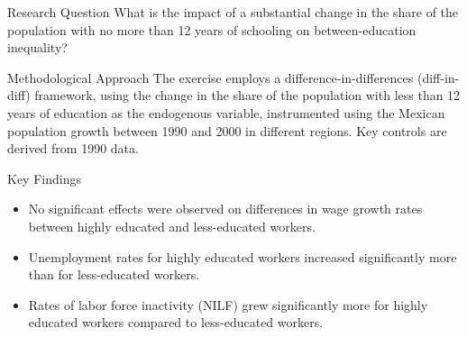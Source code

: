 \begin{frame}

    \begin{block}{Research Question}
        What is the impact of a substantial change in the share of the population with no more than 12 years of schooling on between-education inequality?
    \end{block}
    
    \begin{block}{Methodological Approach}
        The exercise employs a difference-in-differences (diff-in-diff) framework, using the change in the share of the population with less than 12 years of education as the endogenous variable, instrumented using the Mexican population growth between 1990 and 2000 in different regions. Key controls are derived from 1990 data.
    \end{block}
    
    \begin{block}{Key Findings}
        \begin{itemize}
            \item No significant effects were observed on differences in wage growth rates between highly educated and less-educated workers.
            \item Unemployment rates for highly educated workers increased significantly more than for less-educated workers.
            \item Rates of labor force inactivity (NILF) grew significantly more for highly educated workers compared to less-educated workers.
        \end{itemize}
    \end{block}

\end{frame}
